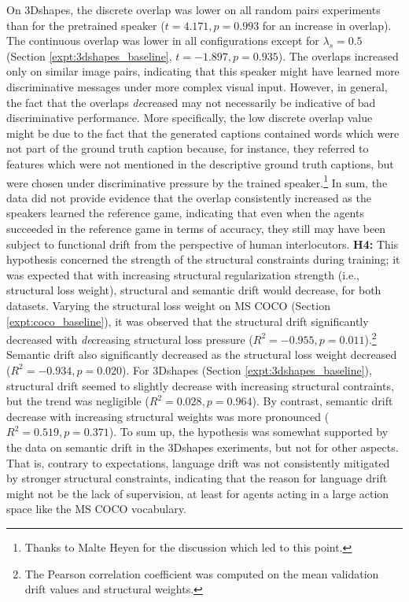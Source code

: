 On 3Dshapes, the discrete overlap was lower on all random pairs experiments than for the pretrained speaker ($t = 4.171, p = 0.993$ for an increase in overlap). The continuous overlap was lower in all configurations except for $\lambda_s=0.5$ (Section \ref{expt:3dshapes_baseline}, $t = -1.897, p = 0.935$). The overlaps increased only on similar image pairs, indicating that this speaker might have learned more discriminative messages under more complex visual input.
However, in general, the fact that the overlaps \emph{de}creased may not necessarily be indicative of bad discriminative performance. More specifically, the low discrete overlap value might be due to the fact that the generated captions contained words which were not part of the ground truth caption because, for instance, they referred to features which were not mentioned in the descriptive ground truth captions, but were chosen under discriminative pressure by the trained speaker.\footnote{Thanks to Malte Heyen for the discussion which led to this point.} 
In sum, the data did not provide evidence that the overlap consistently increased as the speakers learned the reference game, indicating that even when the agents succeeded in the reference game in terms of accuracy, they still may have been subject to functional drift from the perspective of human interlocutors.\newline
\textbf{H4:} This hypothesis concerned the strength of the structural constraints during training; it was expected that with increasing structural regularization strength (i.e., structural loss weight), structural and semantic drift would decrease, for both datasets. Varying the structural loss weight on MS COCO (Section \ref{expt:coco_baseline}), it was observed that the structural drift significantly decreased with \textit{de}creasing structural loss pressure ($R^2 = -0.955, p = 0.011$).\footnote{The Pearson correlation coefficient was computed on the mean validation drift values and structural weights.} Semantic drift also significantly decreased as the structural loss weight decreased ($R^2 = -0.934, p =0.020$). For 3Dshapes (Section \ref{expt:3dshapes_baseline}), structural drift seemed to slightly decrease with increasing structural contraints, but the trend was negligible ($R^2=0.028, p = 0.964$). By contrast, semantic drift decrease with increasing structural weights was more pronounced ($R^2 = 0.519, p = 0.371$). To sum up, the hypothesis was somewhat supported by the data on semantic drift in the 3Dshapes exeriments, but not for other aspects. That is, contrary to expectations, language drift was not consistently mitigated by stronger structural constraints, indicating that the reason for language drift might not be the lack of supervision, at least for agents acting in a large action space like the MS COCO vocabulary. \newline
